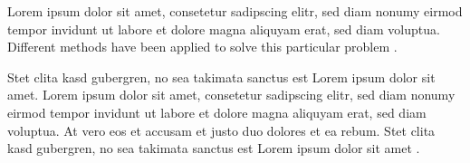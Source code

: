 Lorem ipsum dolor sit amet, consetetur sadipscing elitr, sed diam nonumy eirmod tempor invidunt ut labore et dolore magna aliquyam erat, sed diam voluptua. Different methods have been applied to solve this particular problem \autocite[]{McConnell:2004:CCS:1096143,Vandevoorde:2002}. 

Stet clita kasd gubergren, no sea takimata sanctus est Lorem ipsum dolor sit amet. Lorem ipsum dolor sit amet, consetetur sadipscing elitr, sed diam nonumy eirmod tempor invidunt ut labore et dolore magna aliquyam erat, sed diam voluptua. At vero eos et accusam et justo duo dolores et ea rebum. Stet clita kasd gubergren, no sea takimata sanctus est Lorem ipsum dolor sit amet .